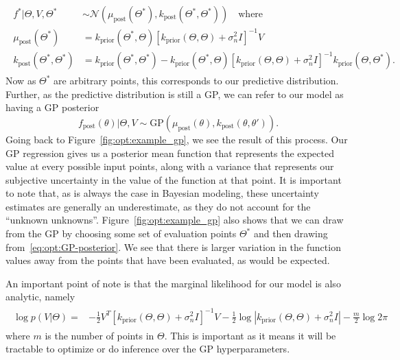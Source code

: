\begin{align}
\label{eq:opt:GP-posterior}
\begin{split}
f^* | \Theta, V, \Theta^* &\sim \mathcal{N}\left(\mu_{\text{post}} \left(\Theta^*\right), 
k_{\text{post}} \left(\Theta^*,\Theta^*\right) \right) \quad \text{where} \\
\mu_{\text{post}}  \left(\Theta^*\right) & = k_{\text{prior}}\left(\Theta^*,{\Theta} \right) \left[k_{\text{prior}}\left({\Theta} ,{\Theta}  \right) + \sigma_n^2 I\right]^{-1} V\\
k_{\text{post}} \left(\Theta^*,\Theta^*\right) & = k_{\text{prior}} \left(\Theta^*,\Theta^*\right) - k_{\text{prior}}\left(\Theta^*,{\Theta} \right) \left[k_{\text{prior}}\left({\Theta},{\Theta} \right) + \sigma_n^2 I\right]^{-1} k_{\text{prior}}\left({\Theta} ,\Theta^*\right).
\end{split}
\end{align}
Now as $\Theta^*$ are arbitrary points, this corresponds to our predictive distribution.
Further, as the predictive distribution is still a GP, we can refer to our
model as having a GP posterior
\[
f_{\text{post}} (\theta) | \Theta, V \sim \text{GP}\left(\mu_{\text{post}} (\theta),k_{\text{post}}(\theta,\theta')\right).
\]
Going back to Figure~\ref{fig:opt:example_gp}, we see the result of this process.
Our GP regression gives us a posterior mean function that represents the expected value
at every possible input points, along with a variance that represents our subjective
uncertainty in the value of the function at that point.  It is important to note that, as is
always the case in Bayesian modeling, these uncertainty estimates are generally  an underestimate,
as they do not account for the ``unknown unknowns''.  Figure~\ref{fig:opt:example_gp} also
shows that we can draw from the GP by choosing some set of evaluation points $\Theta^*$ and
then drawing from~\eqref{eq:opt:GP-posterior}.  We see that there is larger variation in the
function values away from the points that have been evaluated, as would be expected.

An important point of note is that the marginal likelihood for our model is also analytic, namely
\begin{align}
\label{eq:opt:GP-ML}
\begin{split}
\log p(V | \Theta) = &-\frac{1}{2} V^T \left[k_{\text{prior}}\left({\Theta} ,{\Theta}  \right) + \sigma_n^2 I\right]^{-1} V
-\frac{1}{2} \log \left|k_{\text{prior}}\left({\Theta} ,{\Theta}  \right) + \sigma_n^2 I\right|-\frac{m}{2} \log 2\pi
\end{split}
\end{align}
where $m$ is the number of points in $\Theta$.  This is important as it means it will be tractable to
optimize or do inference over the GP hyperparameters.

